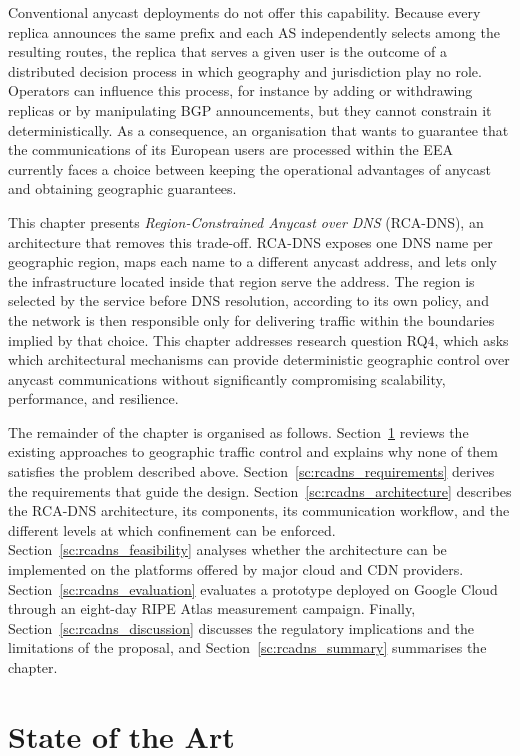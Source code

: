 \documentclass[
A4paper,                %
twoside,                %
openright,              %
chapterprefix=true,     %
12pt,                   %
headings=normal,        %
titlepage=on            %
]{book}
\begin{document}
Conventional anycast deployments do not offer this capability. Because every replica announces the same prefix and each AS independently selects among the resulting routes, the replica that serves a given user is the outcome of a distributed decision process in which geography and jurisdiction play no role. Operators can influence this process, for instance by adding or withdrawing replicas or by manipulating BGP announcements, but they cannot constrain it deterministically. As a consequence, an organisation that wants to guarantee that the communications of its European users are processed within the EEA currently faces a choice between keeping the operational advantages of anycast and obtaining geographic guarantees.

This chapter presents \textit{Region-Constrained Anycast over DNS} (RCA-DNS), an architecture that removes this trade-off. RCA-DNS exposes one DNS name per geographic region, maps each name to a different anycast address, and lets only the infrastructure located inside that region serve the address. The region is selected by the service before DNS resolution, according to its own policy, and the network is then responsible only for delivering traffic within the boundaries implied by that choice. This chapter addresses research question RQ4, which asks which architectural mechanisms can provide deterministic geographic control over anycast communications without significantly compromising scalability, performance, and resilience.

The remainder of the chapter is organised as follows. Section~\ref{sc:rcadns_related} reviews the existing approaches to geographic traffic control and explains why none of them satisfies the problem described above. Section~\ref{sc:rcadns_requirements} derives the requirements that guide the design. Section~\ref{sc:rcadns_architecture} describes the RCA-DNS architecture, its components, its communication workflow, and the different levels at which confinement can be enforced. Section~\ref{sc:rcadns_feasibility} analyses whether the architecture can be implemented on the platforms offered by major cloud and CDN providers. Section~\ref{sc:rcadns_evaluation} evaluates a prototype deployed on Google Cloud through an eight-day RIPE Atlas measurement campaign. Finally, Section~\ref{sc:rcadns_discussion} discusses the regulatory implications and the limitations of the proposal, and Section~\ref{sc:rcadns_summary} summarises the chapter.

\section{State of the Art}
\label{sc:rcadns_related}
\end{document}
